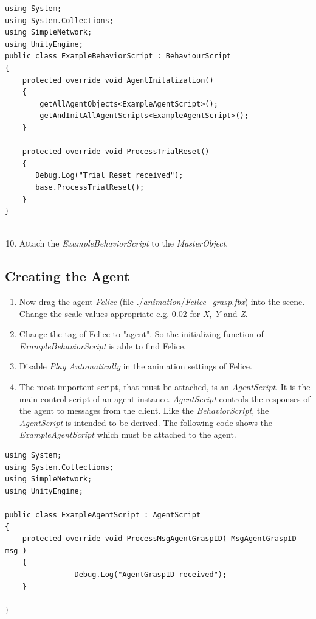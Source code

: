\documentclass[10pt,final]{scrreprt}
\begin{document}
\begin{lstlisting}
using System;
using System.Collections;
using SimpleNetwork;
using UnityEngine;
public class ExampleBehaviorScript : BehaviourScript
{
    protected override void AgentInitalization()
    {
        getAllAgentObjects<ExampleAgentScript>();
        getAndInitAllAgentScripts<ExampleAgentScript>();
    }

    protected override void ProcessTrialReset()
    {
       Debug.Log("Trial Reset received");
       base.ProcessTrialReset();
    }
}


\end{lstlisting}

\begin{enumerate}
\setcounter{enumi}{9}
\item Attach the \emph{ExampleBehaviorScript} to the \emph{MasterObject}.
\end{enumerate}

\subsection{Creating the Agent}
\label{createagent}



\begin{enumerate}
\item Now drag the agent \emph{Felice}  (file ./\emph{animation}/\emph{Felice\_grasp.fbx}) into the scene. Change the scale values appropriate e.g. 0.02 for \emph{X}, \emph{Y} and \emph{Z}.
\item Change the tag of Felice to "agent". So the initializing function of \emph{ExampleBehaviorScript} is able to find Felice.
\item Disable \emph{Play Automatically} in the animation settings of Felice.
\item The most importent script, that must be attached, is an \emph{AgentScript}. It is the main control script of an agent instance. \emph{AgentScript} controls the responses of the agent to messages from the client. Like the \emph{BehaviorScript}, the \emph{AgentScript} is intended to be derived. The following code shows the \emph{ExampleAgentScript} which must be attached to the agent.
\end{enumerate}

\begin{lstlisting}
using System;
using System.Collections;
using SimpleNetwork;
using UnityEngine;

public class ExampleAgentScript : AgentScript
{
	protected override void ProcessMsgAgentGraspID( MsgAgentGraspID msg )	
	{
        		Debug.Log("AgentGraspID received");
	}

}
\end{lstlisting}
\end{document}
